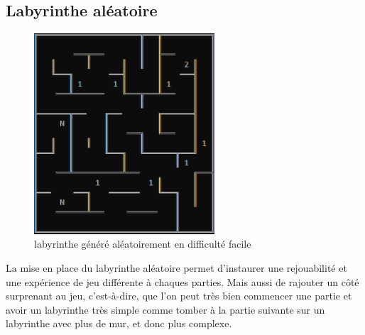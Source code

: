 \documentclass[12pt,a4paper,twoside]{article}
\begin{document}
\subsection{Labyrinthe aléatoire}
\begin{figure}[h]
\centering
\includegraphics[width=0.6\textwidth]{IMG/laby_dern.png}
\caption{labyrinthe généré aléatoirement en difficulté facile}
\end{figure}
\newpage
La mise en place du labyrinthe aléatoire permet d'instaurer une rejouabilité et une expérience de jeu différente à chaques parties. Mais aussi de rajouter un côté surprenant au jeu, c'est-à-dire, que l'on peut très bien commencer une partie et avoir un labyrinthe très simple comme tomber à la partie suivante sur un labyrinthe avec plus de mur, et donc plus complexe.
\end{document}
